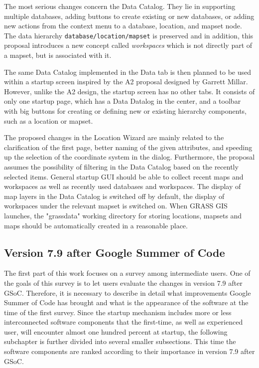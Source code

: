 \documentclass[a4paper,10pt,twoside]{article}
\begin{document}
The most serious changes concern the Data Catalog. They lie in supporting multiple databases, adding buttons to create existing or new databases, or adding new actions from the context menu to a database, location, and mapset node. The data hierarchy \texttt{database/location/mapset} is preserved and in addition, this proposal introduces a new concept called \textit{workspaces} which is not directly part of a mapset, but is associated with it.

The same Data Catalog implemented in the Data tab is then planned to be used within a startup screen inspired by the A2 proposal designed by Garrett Millar. However, unlike the A2 design, the startup screen has no other tabs. It consists of only one startup page, which has a Data Datalog in the center, and a toolbar with big buttons for creating or defining new or existing hierarchy components, such as a location or mapset.

The proposed changes in the Location Wizard are mainly related to the clarification of the first page, better naming of the given attributes, and speeding up the selection of the coordinate system in the dialog. Furthermore, the proposal assumes the possibility of filtering in the Data Catalog based on the recently selected items. General startup GUI should be able to collect recent maps and workspaces as well as recently used databases and workspaces. The display of map layers in the Data Catalog is switched off by default, the display of workspaces under the relevant mapset is switched on. When GRASS GIS launches, the "grassdata" working directory for storing locations, mapsets and maps should be automatically created in a reasonable place.


\subsection{Version 7.9 after Google Summer of Code}
\label{subsection:Version 7.9 after Google Summer of Code}
\noindent
The first part of this work focuses on a survey among intermediate users. One of the goals of this survey is to let users evaluate the changes in version 7.9 after GSoC. Therefore, it is necessary to describe in detail what improvements Google Summer of Code has brought and what is the appearance of the software at the time of the first survey.
Since the startup mechanism includes more or less interconnected software components that the first-time, as well as experienced user, will encounter almost one hundred percent at startup, the following subchapter is further divided into several smaller subsections. This time the software components are ranked according to their importance in version 7.9 after GSoC.
\end{document}
